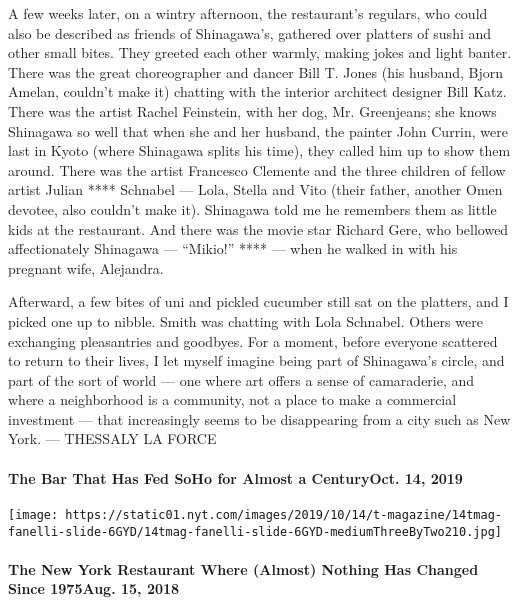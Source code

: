 ​A few weeks later, on a wintry afternoon, the restaurant's regulars,
who could also be described as friends of Shinagawa's, gathered over
platters of sushi and other small bites. They greeted each other warmly,
making jokes and light banter. There was the great choreographer and
dancer Bill T. Jones (his husband, Bjorn Amelan, couldn't make it)
chatting with the interior architect designer Bill Katz. There was the
artist Rachel Feinstein, with her dog, Mr. Greenjeans; she knows
Shinagawa so well that when she and her husband, the painter John
Currin, were last in Kyoto (where Shinagawa splits his time), they
called him up to show them around. There was the artist Francesco
Clemente and the three children of fellow artist Julian **** Schnabel
--- Lola, Stella and Vito (their father, another Omen devotee, also
couldn't make it). Shinagawa told me he remembers them as little kids at
the restaurant. And there was the movie star Richard Gere, who bellowed
affectionately Shinagawa --- ``Mikio!'' **** --- when he walked in with
his pregnant wife, Alejandra.

​Afterward, a few bites of uni and pickled cucumber still sat on the
platters, and I picked one up to nibble. Smith was chatting with Lola
Schnabel. Others were exchanging pleasantries and goodbyes. For a
moment, before everyone scattered to return to their lives, I let myself
imagine being part of Shinagawa's circle, and part of the sort of world
--- one where art offers a sense of camaraderie, and where a
neighborhood is a community, not a place to make a commercial investment
--- that increasingly seems to be disappearing from a city such as New
York. --- THESSALY LA FORCE

\href{https://www.nytimes.com/2019/10/14/t-magazine/fanelli-cafe.html}{}

\hypertarget{the-bar-that-has-fed-soho-for-almost-a-centuryoct-14-2019}{%
\paragraph{The Bar That Has Fed SoHo for Almost a CenturyOct. 14,
2019}\label{the-bar-that-has-fed-soho-for-almost-a-centuryoct-14-2019}}

\texttt{[image: https://static01.nyt.com/images/2019/10/14/t-magazine/14tmag-fanelli-slide-6GYD/14tmag-fanelli-slide-6GYD-mediumThreeByTwo210.jpg]}
\href{https://www.nytimes.com/2018/08/14/t-magazine/raouls-new-york-restaurant-history.html}{}

\hypertarget{the-new-york-restaurant-where-almost-nothing-has-changed-since-1975aug-15-2018}{%
\paragraph{The New York Restaurant Where (Almost) Nothing Has Changed
Since 1975Aug. 15,
2018}\label{the-new-york-restaurant-where-almost-nothing-has-changed-since-1975aug-15-2018}}

